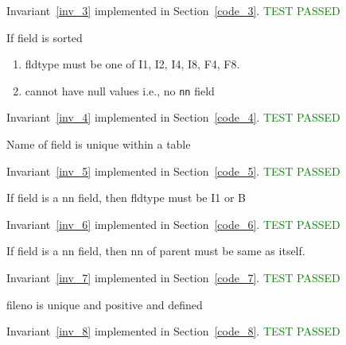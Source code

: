 \documentclass{report}
\begin{document}
Invariant~\ref{inv_3} implemented in     Section~\ref{code_3}.
\textcolor{green}{TEST PASSED}
 \begin{invariant}
 \label{inv_4}
 If field is sorted
 \begin{enumerate}
 \item fldtype must be one of I1, I2, I4, I8, F4, F8. 
 \item cannot have null values i.e., no {\tt nn} field 
 \end{enumerate}
 \end{invariant}
Invariant~\ref{inv_4} implemented in     Section~\ref{code_4}.
\textcolor{green}{TEST PASSED}
 \begin{invariant}
 \label{inv_5}
 Name of field is unique within a table 
 \end{invariant}
Invariant~\ref{inv_5} implemented in     Section~\ref{code_5}.
\textcolor{green}{TEST PASSED}
 \begin{invariant}
 \label{inv_6}
 If field is a nn field, then fldtype must be I1 or B
 \end{invariant}
Invariant~\ref{inv_6} implemented in     Section~\ref{code_6}.
\textcolor{green}{TEST PASSED}
 \begin{invariant}
 \label{inv_7}
 If field is a nn field, then nn of parent must be same as itself.
 \end{invariant}
Invariant~\ref{inv_7} implemented in     Section~\ref{code_7}.
\textcolor{green}{TEST PASSED}
 \begin{invariant}
 \label{inv_8}
 fileno is unique and positive and defined
 \end{invariant}
Invariant~\ref{inv_8} implemented in     Section~\ref{code_8}.
\textcolor{green}{TEST PASSED}
\end{document}
